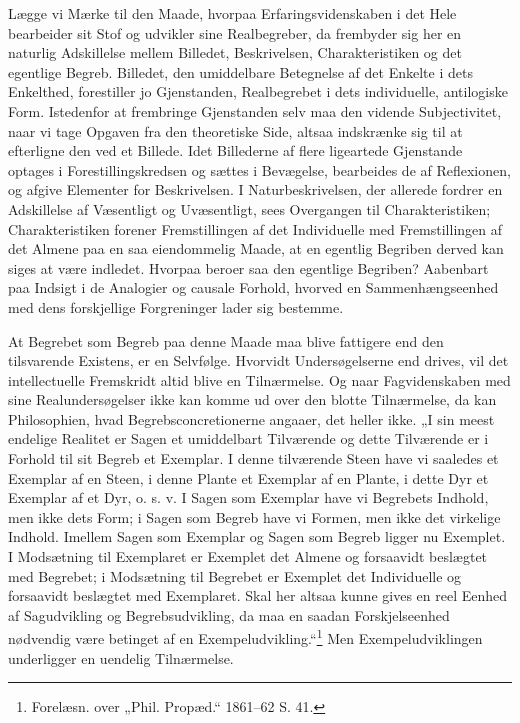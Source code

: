 \documentclass[11pt]{book}
\newcommand{\opage}[1]{\marginnote{\footnotesize\textit{[#1]}}}
\begin{document}
Lægge vi Mærke til den Maade, hvorpaa Erfaringsvidenskaben i det Hele
bearbeider sit Stof og udvikler sine Realbegreber, da frembyder sig her
en naturlig Adskillelse mellem Billedet, Beskrivelsen, Charakteristiken
og det egentlige Begreb. Billedet, den umiddelbare Betegnelse af det
Enkelte i dets Enkelthed, forestiller jo Gjenstanden, Realbegrebet i
dets individuelle, antilogiske Form. Istedenfor at frembringe
Gjenstanden selv maa den vidende Subjectivitet, naar vi tage Opgaven
fra den theoretiske Side, altsaa indskrænke sig til at efterligne den
ved et Billede. Idet Billederne af flere ligeartede Gjenstande optages
i Forestillingskredsen og sættes i Bevægelse, bearbeides de af
Reflexionen, og afgive Elementer for Beskrivelsen. I Naturbeskrivelsen,
der allerede fordrer en Adskillelse af Væsentligt og Uvæsentligt, sees
Overgangen til Charakteristiken; Charakteristiken forener Fremstillingen
af det Individuelle med Fremstillingen af det Almene paa en saa
eiendommelig Maade, at en egentlig Begriben derved kan siges at være
indledet. Hvorpaa beroer saa den egentlige Begriben? Aabenbart paa
Indsigt i de Analogier og causale Forhold, hvorved en
Sammenhængseenhed med dens forskjellige Forgreninger lader sig
bestemme.

\opage{197} \setcounter{footnote}{0}%
At Begrebet som Begreb paa denne Maade maa blive fattigere end den
tilsvarende Existens, er en Selvfølge. Hvorvidt Undersøgelserne end
drives, vil det intellectuelle Fremskridt altid blive en Tilnærmelse.
Og naar Fagvidenskaben med sine Realundersøgelser ikke kan komme ud
over den blotte Tilnærmelse, da kan Philosophien, hvad
Begrebsconcretionerne angaaer, det heller ikke. „I sin meest endelige
Realitet er Sagen et umiddelbart Tilværende og dette Tilværende er i
Forhold til sit Begreb et Exemplar. I denne tilværende Steen have vi
saaledes et Exemplar af en Steen, i denne Plante et Exemplar af en
Plante, i dette Dyr et Exemplar af et Dyr, o. s. v. I Sagen som
Exemplar have vi Begrebets Indhold, men ikke dets Form; i Sagen som
Begreb have vi Formen, men ikke det virkelige Indhold. Imellem Sagen
som Exemplar og Sagen som Begreb ligger nu Exemplet. I Modsætning til
Exemplaret er Exemplet det Almene og forsaavidt beslægtet med
Begrebet; i Modsætning til Begrebet er Exemplet det Individuelle og
forsaavidt beslægtet med Exemplaret. Skal her altsaa kunne gives en
reel Eenhed af Sagudvikling og Begrebsudvikling, da maa en saadan
Forskjelseenhed nødvendig være betinget af en
Exempeludvikling.“\footnote{%
Forelæsn. over „Phil. Propæd.“ 1861--62 S. 41.} Men
Exempeludviklingen underligger en uendelig Tilnærmelse.
\end{document}
